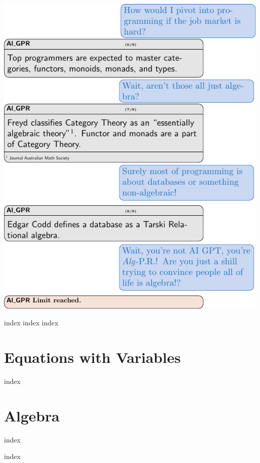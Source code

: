 \documentclass[12pt,twoside,letterpaper]{memoir}
\begin{document}
\includegraphics[width=\textwidth]{3-operators/AlGPR2.pdf}

{index}
{index}
{index}


\part{Equations with Variables}


{index}

\part{Algebra}

{index}

{index}
\end{document}
